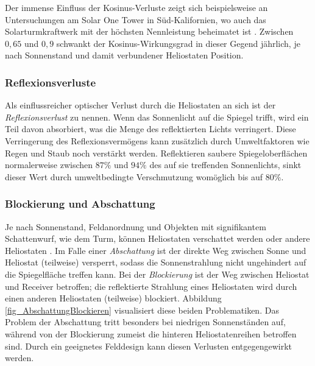 Der immense Einfluss der Kosinus-Verluste zeigt sich beispielsweise an Untersuchungen am Solar One Tower in Süd-Kalifornien, wo auch das Solarturmkraftwerk mit der höchsten Nennleistung beheimatet ist \cite{Ivanpah}.
Zwischen $0,65$ und $0,9$ schwankt der Kosinus-Wirkungsgrad in dieser Gegend jährlich, je nach Sonnenstand und damit verbundener Heliostaten Position. \cite{Holl}

\subsubsection*{Reflexionsverluste} \label{subsubsec_Reflexionsverluste}
Als einflussreicher optischer Verlust durch die Heliostaten an sich ist der \textit{Reflexionsverlust} zu nennen.
Wenn das Sonnenlicht auf die Spiegel trifft, wird ein Teil davon absorbiert, was die Menge des reflektierten Lichts verringert.
Diese Verringerung des Reflexionsvermögens kann zusätzlich durch Umweltfaktoren wie Regen und Staub noch verstärkt werden.
Reflektieren saubere Spiegeloberflächen normalerweise zwischen $87 \%$ und $94 \%$ des auf sie treffenden Sonnenlichts, sinkt dieser Wert durch umweltbedingte Verschmutzung womöglich bis auf $80 \%$. \cite[S.14]{DissBelhomme}

\subsubsection*{Blockierung und Abschattung} \label{subsubsec_blockingshading}
Je nach Sonnenstand, Feldanordnung und Objekten mit signifikantem Schattenwurf, wie dem Turm, können Heliostaten verschattet werden oder andere Heliostaten .
Im Falle einer \textit{Abschattung} ist der direkte Weg zwischen Sonne und Heliostat (teilweise) versperrt, sodass die Sonnenstrahlung nicht ungehindert auf die Spiegelfläche treffen kann.
Bei der \textit{Blockierung} ist der Weg zwischen Heliostat und Receiver betroffen; die reflektierte Strahlung eines Heliostaten wird durch einen anderen Heliostaten (teilweise) blockiert.
Abbildung \ref{fig_AbschattungBlockieren} visualisiert diese beiden Problematiken.
Das Problem der Abschattung tritt besonders bei niedrigen Sonnenständen auf, während von der Blockierung zumeist die hinteren Heliostatenreihen betroffen sind.
Durch ein geeignetes Felddesign kann diesen Verlusten entgegengewirkt werden. \cite[S.686]{Wei2010}

